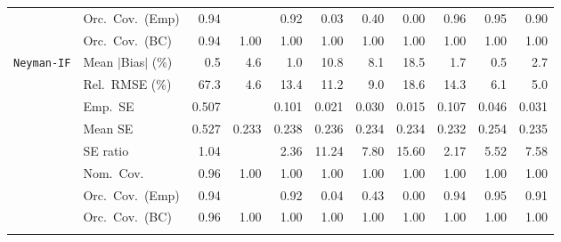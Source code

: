 \begin{landscape}
\begin{longtable}{llrrrrrrrrr}
 & Orc.\ Cov.\ (Emp) & \cellcolor{ranktwo}0.94 &  & \cellcolor{rankthree}0.92 & 0.03 & 0.40 & 0.00 & \cellcolor{ranktwo}0.96 & \cellcolor{rankone}0.95 & 0.90 \\
 & Orc.\ Cov.\ (BC) & \cellcolor{rankone}0.94 & \cellcolor{ranktwo}1.00 & \cellcolor{ranktwo}1.00 & \cellcolor{ranktwo}1.00 & \cellcolor{ranktwo}1.00 & \cellcolor{ranktwo}1.00 & \cellcolor{ranktwo}1.00 & \cellcolor{ranktwo}1.00 & \cellcolor{ranktwo}1.00 \\
\addlinespace[2pt]
\quad \texttt{Neyman-IF} & Mean $|$Bias$|$ (\%) & \cellcolor{rankone}0.5 & 4.6 & \cellcolor{ranktwo}1.0 & 10.8 & 8.1 & 18.5 & \cellcolor{rankthree}1.7 & \cellcolor{rankone}0.5 & 2.7 \\
 & Rel.\ RMSE (\%) & 67.3 & \cellcolor{rankone}4.6 & 13.4 & 11.2 & 9.0 & 18.6 & 14.3 & \cellcolor{rankthree}6.1 & \cellcolor{ranktwo}5.0 \\
 & Emp.\ SE & 0.507 &  & 0.101 & 0.021 & 0.030 & 0.015 & 0.107 & 0.046 & 0.031 \\
 & Mean SE & 0.527 & 0.233 & 0.238 & 0.236 & 0.234 & 0.234 & 0.232 & 0.254 & 0.235 \\
 & SE ratio & \cellcolor{rankone}1.04 &  & \cellcolor{rankthree}2.36 & 11.24 & 7.80 & 15.60 & \cellcolor{ranktwo}2.17 & 5.52 & 7.58 \\
 & Nom.\ Cov. & \cellcolor{rankone}0.96 & \cellcolor{ranktwo}1.00 & \cellcolor{ranktwo}1.00 & \cellcolor{ranktwo}1.00 & \cellcolor{ranktwo}1.00 & \cellcolor{ranktwo}1.00 & \cellcolor{ranktwo}1.00 & \cellcolor{ranktwo}1.00 & \cellcolor{ranktwo}1.00 \\
 & Orc.\ Cov.\ (Emp) & \cellcolor{ranktwo}0.94 &  & \cellcolor{rankthree}0.92 & 0.04 & 0.43 & 0.00 & \cellcolor{ranktwo}0.94 & \cellcolor{rankone}0.95 & 0.91 \\
 & Orc.\ Cov.\ (BC) & \cellcolor{rankone}0.96 & \cellcolor{ranktwo}1.00 & \cellcolor{ranktwo}1.00 & \cellcolor{ranktwo}1.00 & \cellcolor{ranktwo}1.00 & \cellcolor{ranktwo}1.00 & \cellcolor{ranktwo}1.00 & \cellcolor{ranktwo}1.00 & \cellcolor{ranktwo}1.00 \\
\addlinespace[2pt]
\end{longtable}
\end{landscape}
